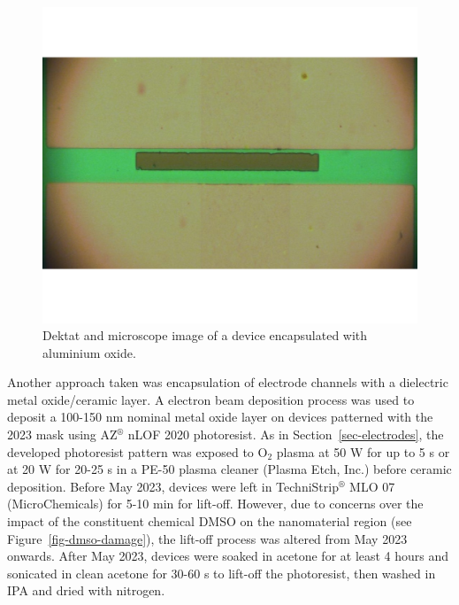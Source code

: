 \documentclass[
  a4paper,
]{scrbook}
\begin{document}
\begin{figure}
\begin{minipage}[t]{0.47\linewidth}
{{\includegraphics{./figures/ch4/al2o3_encapsulation.png}

}

}

\end{minipage}%

\caption{\label{fig-dektat-dielectric-layer}Dektat and microscope image
of a device encapsulated with aluminium oxide.}

\end{figure}

Another approach taken was encapsulation of electrode channels with a
dielectric metal oxide/ceramic layer. A electron beam deposition process
was used to deposit a 100-150 nm nominal metal oxide layer on devices
patterned with the 2023 mask using AZ\(^\circledR\) nLOF 2020
photoresist. As in Section~\ref{sec-electrodes}, the developed
photoresist pattern was exposed to O\(_2\) plasma at 50 W for up to 5 s
or at 20 W for 20-25 s in a PE-50 plasma cleaner (Plasma Etch, Inc.)
before ceramic deposition. Before May 2023, devices were left in
TechniStrip\(^\circledR\) MLO 07 (MicroChemicals) for 5-10 min for
lift-off. However, due to concerns over the impact of the constituent
chemical DMSO on the nanomaterial region (see
Figure~\ref{fig-dmso-damage}), the lift-off process was altered from May
2023 onwards. After May 2023, devices were soaked in acetone for at
least 4 hours and sonicated in clean acetone for 30-60 s to lift-off the
photoresist, then washed in IPA and dried with nitrogen.
\end{document}
